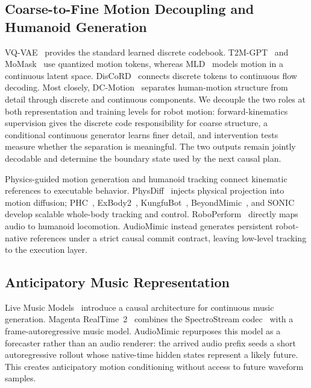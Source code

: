 \documentclass[conference]{IEEEtran}
\newcommand{\method}{AudioMimic}
\begin{document}
\subsection{Coarse-to-Fine Motion Decoupling and Humanoid Generation}
VQ-VAE~\cite{vandenOord2017vqvae} provides the standard learned discrete codebook. T2M-GPT~\cite{zhang2023t2mgpt} and MoMask~\cite{guo2024momask} use quantized motion tokens, whereas MLD~\cite{chen2023mld} models motion in a continuous latent space. DisCoRD~\cite{cho2025discord} connects discrete tokens to continuous flow decoding. Most closely, DC-Motion~\cite{wang2026dcmotion} separates human-motion structure from detail through discrete and continuous components. We decouple the two roles at both representation and training levels for robot motion: forward-kinematics supervision gives the discrete code responsibility for coarse structure, a conditional continuous generator learns finer detail, and intervention tests measure whether the separation is meaningful. The two outputs remain jointly decodable and determine the boundary state used by the next causal plan.

Physics-guided motion generation and humanoid tracking connect kinematic references to executable behavior. PhysDiff~\cite{yuan2023physdiff} injects physical projection into motion diffusion; PHC~\cite{luo2023phc}, ExBody2~\cite{ji2024exbody2}, KungfuBot~\cite{xie2026kungfubot}, BeyondMimic~\cite{liao2025beyondmimic}, and SONIC~\cite{luo2026sonic} develop scalable whole-body tracking and control. RoboPerform~\cite{li2026roboperform} directly maps audio to humanoid locomotion. \method{} instead generates persistent robot-native references under a strict causal commit contract, leaving low-level tracking to the execution layer.

\subsection{Anticipatory Music Representation}
Live Music Models~\cite{gdmlyria2025live} introduce a causal architecture for continuous music generation. Magenta RealTime~2~\cite{magenta2026mrt2} combines the SpectroStream codec~\cite{li2025spectrostream} with a frame-autoregressive music model. \method{} repurposes this model as a forecaster rather than an audio renderer: the arrived audio prefix seeds a short autoregressive rollout whose native-time hidden states represent a likely future. This creates anticipatory motion conditioning without access to future waveform samples.
\end{document}
